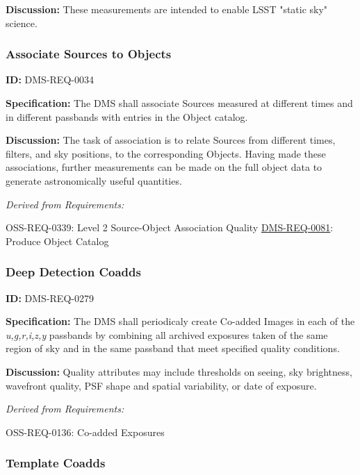 \documentclass[SE,toc,lsstdraft]{lsstdoc}
\begin{document}
\textbf{Discussion: }These measurements are intended to enable LSST "static sky" science.




\subsubsection{Associate Sources to Objects}

\label{DMS-REQ-0034}
\textbf{ID:} DMS-REQ-0034

\textbf{Specification:} The DMS shall associate Sources measured at different times and in different passbands with entries in the Object catalog.

\textbf{Discussion:} The task of association is to relate Sources from different times, filters, and sky positions, to the corresponding Objects. Having made these associations, further measurements can be made on the full object data to generate astronomically useful quantities.




\emph{Derived from Requirements:}

OSS-REQ-0339:
Level 2 Source-Object Association Quality \newline
\hyperref[DMS-REQ-0081]{DMS-REQ-0081}:
Produce Object Catalog \newline


\subsubsection{Deep Detection Coadds}

\label{DMS-REQ-0279}
\textbf{ID:} DMS-REQ-0279

\textbf{Specification:} The DMS shall periodicaly create Co-added Images in each of the \textit{u,g,r,i,z,y} passbands by combining all archived exposures taken of the same region of sky and in the same passband that meet specified quality conditions.

\textbf{Discussion: }Quality attributes may include thresholds on seeing, sky brightness, wavefront quality, PSF shape and spatial variability, or date of exposure.




\emph{Derived from Requirements:}

OSS-REQ-0136:
Co-added Exposures \newline


\subsubsection{Template Coadds}
\end{document}
